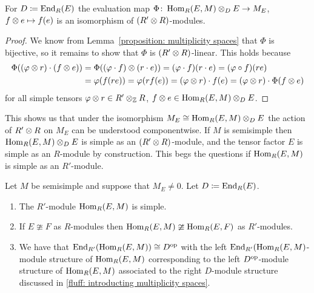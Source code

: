 \begin{lemma}
  For $D \coloneqq \operatorname{End}_R(E)$ the evaluation map $\Phi \colon \operatorname{Hom}_R(E,M) \mathbin{\otimes}_D E \to M_E$, $f \mathbin{\otimes} e \mapsto f(e)$ is an isomorphism of $(R' \mathbin{\otimes} R)$-modules.
\end{lemma}


\begin{proof}
  We know from Lemma~\ref{proposition: multiplicity spaces} that $\Phi$ is bijective, so it remains to show that $\Phi$ is $(R' \mathbin{\otimes} R)$-linear.
  This holds because
  \begin{align*}
        \Phi((\varphi \mathbin{\otimes} r) \cdot (f \mathbin{\otimes} e))
    &=  \Phi((\varphi \cdot f) \mathbin{\otimes} (r \cdot e))
     =  (\varphi \cdot f)(r \cdot e)
     =  (\varphi \circ f)(re) \\
    &=  \varphi(f(re))
     =  \varphi(rf(e))
     =  (\varphi \mathbin{\otimes} r) \cdot f(e)
     =  (\varphi \mathbin{\otimes} r) \cdot \Phi(f \mathbin{\otimes} e)
  \end{align*}
  for all simple tensors $\varphi \mathbin{\otimes} r \in R' \mathbin{\otimes}_{\mathbb{Z}} R$, $f \mathbin{\otimes} e \in \operatorname{Hom}_R(E,M) \mathbin{\otimes}_D E$.
\end{proof}


\begin{fluff}
  This shows us that under the isomorphism $M_E \cong \operatorname{Hom}_R(E,M) \mathbin{\otimes}_D E$ the action of $R' \mathbin{\otimes} R$ on $M_E$ can be understood componentwise.
  If $M$ is semisimple then $\operatorname{Hom}_R(E,M) \mathbin{\otimes}_D E$ is simple as an $(R' \mathbin{\otimes} R)$-module, and the tensor factor $E$ is simple as an $R$-module by construction.
  This begs the questions if $\operatorname{Hom}_R(E,M)$ is simple as an $R'$-module.
\end{fluff}


\begin{lemma}
  Let $M$ be semisimple and suppose that $M_E \neq 0$.
  Let $D \coloneqq \operatorname{End}_R(E)$.
  \begin{enumerate}
    \item
      The $R'$-module $\operatorname{Hom}_R(E,M)$ is simple.
    \item
      If $E \ncong F$ as $R$-modules then $\operatorname{Hom}_R(E,M) \ncong \operatorname{Hom}_R(E,F)$ as $R'$-modules.
    \item
      We have that $\operatorname{End}_{R'}( \operatorname{Hom}_R(E,M) ) \cong D^{\operatorname{op}}$ with the left $\operatorname{End}_{R'}( \operatorname{Hom}_R(E,M)$-module structure of $\operatorname{Hom}_R(E,M)$ corresponding to the left $D^{\operatorname{op}}$-module structure of $\operatorname{Hom}_R(E,M)$ associated to the right $D$-module structure discussed in \ref{fluff: introducting multiplicity spaces}.
  \end{enumerate}
\end{lemma}


